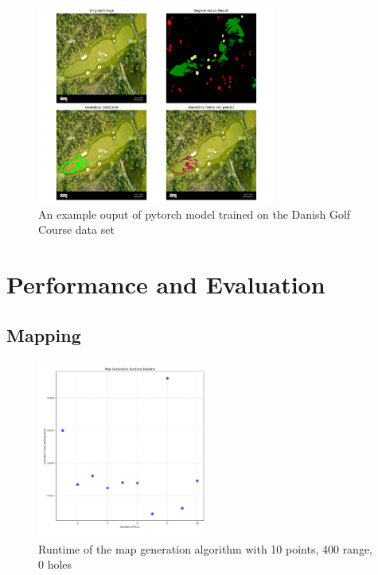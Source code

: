 \documentclass[final]{cmpreport_02}
\begin{document}
\begin{figure}[h!]
	\centering
	\includegraphics[width=0.7\textwidth]{./images/overheadGolfCourse_visualisation.png}
	\caption{An example ouput of pytorch model trained on the Danish Golf Course data set}
	\label{am:ohGCDanish}
\end{figure}

\section{Performance and Evaluation}
\subsection{Mapping}


\begin{figure}[h!]
	\centering
	\includegraphics[width=0.5\textwidth]{./images/mapGenBaselineRT.png}
	\caption{Runtime of the map generation algorithm with 10 points, 400 range, 0 holes}
	\label{PE:mg:baselineRT}
\end{figure}
\end{document}
